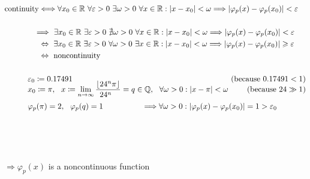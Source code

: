 \documentclass[12pt, a4paper]{article}
\begin{document}
\begin{align*}
\text{continuity}&\Longleftrightarrow \forall x_0\in\mathbb{R} ~\forall \varepsilon>0 ~\exists\omega>0 ~\forall x\in \mathbb{R}    : |x-x_0|<\omega \Longrightarrow |\varphi_p(x)-\varphi_p(x_0)| < \varepsilon\\~\\
 & \hspace*{-2mm}\Longrightarrow~\exists x_0\in\mathbb{R} ~\exists \varepsilon>0 ~\nexists \omega>0 ~\forall x\in \mathbb{R} : |x-x_0|<\omega \Longrightarrow |\varphi_p(x)-\varphi_p(x_0)| < \varepsilon\\
& \Leftrightarrow  ~\exists x_0\in\mathbb{R} ~\exists \varepsilon>0 ~\forall \omega>0 ~\exists x\in \mathbb{R} : |x-x_0|<\omega \Longrightarrow |\varphi_p(x)-\varphi_p(x_0)| \geqslant \varepsilon\\
& \Leftrightarrow ~\text{noncontinuity}\\~\\
&\hspace*{-0.5cm} \varepsilon_0 \coloneqq 0.17491 & \mathllap{\text{(because }0.17491<1)}\\[-3mm]
&\hspace*{-0.5cm} x_0 \coloneqq \pi, ~~x \coloneqq \lim_{n\rightarrow\infty}\frac{\lfloor{24^n\pi}\rfloor}{\phantom{\lceil}{24^n}\phantom{\pi\rceil}} = q \in \mathbb{Q}, ~~\forall\omega>0: |x-\pi|<\omega & \mathllap{\text{(because }24\gg1)}\\
&\hspace*{-0.5cm} \varphi_p(\pi)=2, ~~\varphi_p(q)=1 \hspace{17.5mm}\Longrightarrow \forall\omega>0: |\varphi_p(x)-\varphi_p(x_0)| = 1 > \varepsilon_0
\end{align*}\\~\\~\\
\begin{Large}$\Longrightarrow \varphi_p(x)$ is a noncontinuous function\end{Large}
\end{document}

